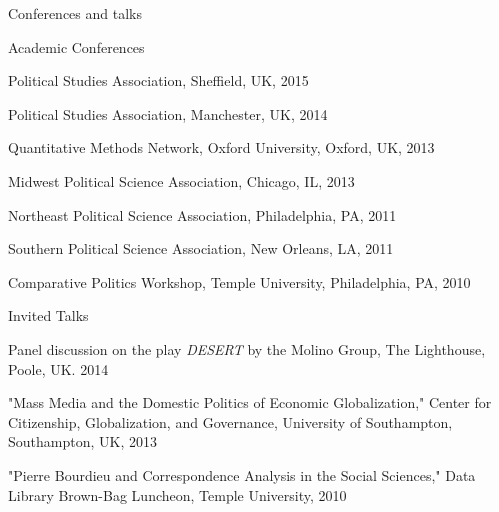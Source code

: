 \documentclass{resume} %
\begin{document}

\begin{rSection}{Conferences and talks}

\begin{rSubsection}{Academic Conferences}{}{}{}
\item Political Studies Association, Sheffield, UK, 2015
\item Political Studies Association, Manchester, UK, 2014
\item Quantitative Methods Network, Oxford University, Oxford, UK, 2013
\item Midwest Political Science Association, Chicago, IL, 2013
\item Northeast Political Science Association, Philadelphia, PA,  2011
\item Southern Political Science Association, New Orleans, LA, 2011
\item Comparative Politics Workshop, Temple University, Philadelphia, PA, 2010
\end{rSubsection}

\hangindent=1cm
\begin{rSubsection}{Invited Talks}{}{}{}
\item Panel discussion on the play \emph{DESERT} by the Molino Group, The Lighthouse, Poole, UK. 2014
\item "Mass Media and the Domestic Politics of Economic Globalization," Center for Citizenship, Globalization, and Governance, University of Southampton, Southampton, UK, 2013
\item "Pierre Bourdieu and Correspondence Analysis in the Social Sciences," Data Library Brown-Bag Luncheon, Temple University, 2010       
\end{rSubsection}

\end{rSection}

\end{document}
